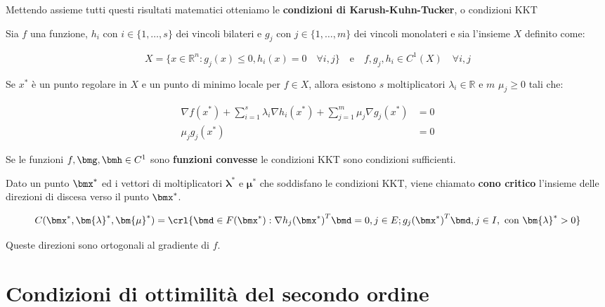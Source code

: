 \documentclass[\main/main.tex]{subfiles}
\begin{document}
Mettendo assieme tutti questi risultati matematici otteniamo le \textbf{condizioni di Karush-Kuhn-Tucker}, o condizioni KKT\@

\begin{theorem}
	Sia \(f \) una funzione, \(h_i \text{ con } i \in \{1, \ldots, s\}\) dei vincoli bilateri e \(g_j \text{ con } j \in \{1, \ldots, m\}\) dei vincoli monolateri e sia l'insieme $X$ definito come:

	\[
		X  = \{x \in \mathbb{R}^n: g_j(x) \leq 0, h_i(x) = 0 \quad \forall i, j \} \quad \text{e} \quad f, g_j, h_i \in C^1(X) \quad \forall i,j
	\]

	Se $x^*$ è un punto regolare in $X$ e un punto di minimo locale per \(f \in X\), allora esistono $s$ moltiplicatori $\lambda_i \in \mathbb{R}$ e $m$ $\mu_j \geq 0$ tali che:

	\begin{align*}
		\nabla f(x^*) + \sum_{i=1}^s \lambda_i \nabla h_i(x^*) + \sum_{j=1}^m \mu_j \nabla g_j(x^*) & = 0 \\
		\mu_j g_j(x^*)                                                                              & = 0
	\end{align*}
\end{theorem}

\begin{theorem}
	Se le funzioni \(f, \bmg, \bmh \in C^1\) sono \textbf{funzioni convesse} le condizioni KKT sono condizioni sufficienti.
\end{theorem}

\begin{definition}
	Dato un punto \(\bmx^*\) ed i vettori di moltiplicatori \(\bm{\lambda}^*\) e \(\bm{\mu}^*\) che soddisfano le condizioni KKT, viene chiamato \textbf{cono critico} l'insieme delle direzioni di discesa verso il punto \(\bmx^*\).

	\[
		C(\bmx^*, \bm{\lambda}^*, \bm{\mu}^*) = \crl{\bmd \in F(\bmx^*) : \nabla {h_j(\bmx^*)}^T\bmd = 0, j \in E; {g_j(\bmx^*)}^T\bmd, j \in I, \text{ con }\bm{\lambda}^*>0}
	\]

	Queste direzioni sono ortogonali al gradiente di \(f\).
\end{definition}

\section{Condizioni di ottimilità del secondo ordine}
\end{document}
